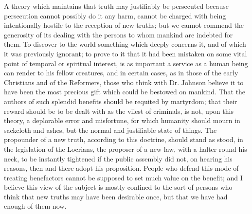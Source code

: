 \documentclass[11pt,openany]{book}
\begin{document}
A theory which maintains that truth may justifiably be persecuted because persecution cannot possibly do it any harm, cannot be charged with being intentionally hostile to the reception of new truths; but we cannot commend the generosity of its dealing with the persons to whom mankind are indebted for them. To discover to the world something which deeply concerns it, and of which it was previously ignorant; to prove to it that it had been mistaken on some vital point of temporal or spiritual interest, is as important a service as a human being can render to his fellow creatures, and in certain cases, as in those of the early Christians and of the Reformers, those who think with Dr. Johnson believe it to have been the most precious gift which could be bestowed on mankind. That the authors of such splendid benefits should be requited by martyrdom; that their reward should be to be dealt with as the vilest of criminals, is not, upon this theory, a deplorable error and misfortune, for which humanity should mourn in sackcloth and ashes, but the normal and justifiable state of things. The propounder of a new truth, according to this doctrine, should stand as stood, in the legislation of the Locrians, the proposer of a new law, with a halter round his neck, to be instantly tightened if the public assembly did not, on hearing his reasons, then and there adopt his proposition. People who defend this mode of treating benefactors cannot be supposed to set much value on the benefit; and I believe this view of the subject is mostly confined to the sort of persons who think that new truths may have been desirable once, but that we have had enough of them now.
\end{document}
